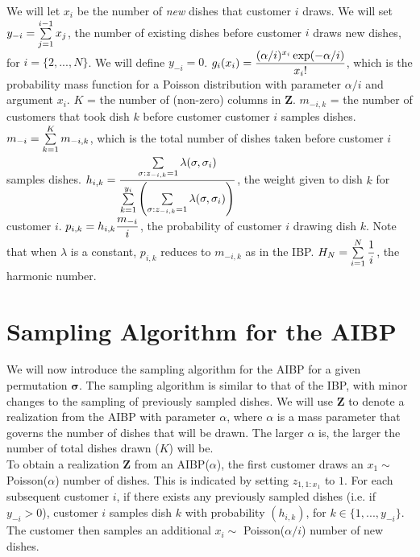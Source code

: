 \noindent
We will let $x_i$ be the number of \textit{new} dishes that customer $i$ draws.
We will set $y_{-i} = \sum\limits_{j=1}^{i-1} x_j$, the number of existing dishes
before customer $i$ draws new dishes, for $i=\{2,...,N\}$. We will define
$y_{-i} = 0$.  $g_i(x_i) = \displaystyle\frac{(\alpha/i)^{x_i}\exp(-\alpha/i)}{x_i!}$,
which is the probability mass function for a Poisson distribution with
parameter $\alpha/i$ and argument $x_i$.  $K$ = the number of (non-zero)
columns in $\bm Z$.  $m_{-i,k}$ = the number of customers that took dish $k$
before customer customer $i$ samples dishes.  $m_{-i} =
\sum\limits_{k=1}^{K}m_{-i,k}$, which is the total number of dishes taken before
customer $i$ samples dishes.  $h_{i,k} =
\displaystyle\frac{\sum\limits_{\sigma:z_{-i,k}=1}^{}\lambda(\sigma,\sigma_i)}
{\sum\limits_{k=1}^{y_i}\left(\sum\limits_{\sigma:z_{-i,k}=1}^{}\lambda(\sigma,\sigma_i)
\right)}$, the weight given to dish $k$ for customer $i$.  $p_{i,k} = h_{i,k}
\displaystyle\frac{m_{-i}}{i}$, the probability of customer $i$ drawing dish $k$. Note
that when $\lambda$ is a constant, $p_{i,k}$ reduces to $m_{-i,k}$ as in the
IBP.  $H_N = \sum\limits_{i=1}^{N} \displaystyle\frac{1}{i}$, the harmonic number.



\section{Sampling Algorithm for the AIBP}
We will now introduce the sampling algorithm for the AIBP for a given
permutation $\bm\sigma$. The sampling algorithm is similar to that of the IBP,
with minor changes to the sampling of previously sampled dishes. We will use 
$\bm Z$ to denote a realization from the AIBP with parameter $\alpha$, where 
$\alpha$ is a mass parameter that governs the number of dishes that will be drawn.
The larger $\alpha$ is, the larger the number of total dishes drawn ($K$) will be.\\

\noindent
To obtain a realization $\bm Z$ from an AIBP($\alpha$), the first customer
draws an $x_1 \sim$ Poisson($\alpha$) number of dishes. This is indicated by
setting $z_{1,1:x_1}$ to $1$. For each subsequent customer $i$, if there exists
any previously sampled dishes (i.e. if $y_{-i}>0$), customer $i$ samples dish $k$
with probability $\left(h_{i,k}\right)$, for $k \in \{1,...,y_{-i}\}$. The customer
then samples an additional $x_i \sim$ Poisson($\alpha/i$) number of new dishes. 

